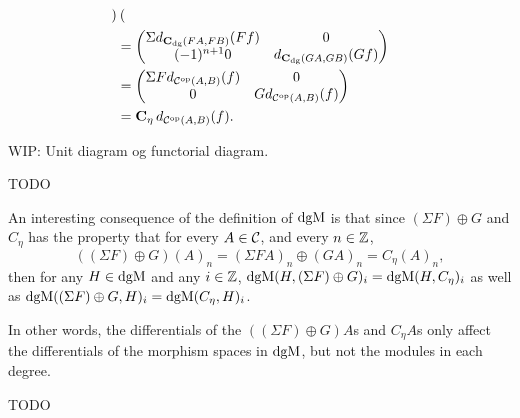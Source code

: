 \begin{remark}
\begin{itemize}
{\begin{align*}
\begin{pmatrix}
                \end{pmatrix} \\
                &=
                \begin{pmatrix}
                    \Sigma d_{\operatorname{\mathbf{C}}_{\operatorname{dg}}(F A, F B)}(F f) & 0 \\
                    (-1)^{n + 1} 0 & d_{\operatorname{\mathbf{C}}_{\operatorname{dg}}(G A, G B)}(G f)
                \end{pmatrix} \\
                &=
                \begin{pmatrix}
                    \Sigma F d_{{\mathcal{C}}^{\operatorname{op}}(A, B)}(f) & 0 \\
                    0 & G d_{{\mathcal{C}}^{\operatorname{op}}(A, B)}(f)
                \end{pmatrix} \\
                &= \operatorname{\mathbf{C}}_{\eta} d_{{\mathcal{C}}^{\operatorname{op}}(A, B)}(f).
            \end{align*}
        }
    \end{itemize}
     
    WIP: Unit diagram og functorial diagram.
\end{remark}

TODO

\begin{remark}
    \label{rem:dgm_different_dg_morphisms_same_space_give_degree-wise_same_morphisms}
    An interesting consequence of the definition of \( \operatorname{dgM} \) is that since \( (\Sigma F) \oplus G \) and \( C_{\eta} \) has the property that for every \( A \in {\mathcal{C}} \), and every \( n \in {\mathbb{Z}} \),
    \[
        ((\Sigma F) \oplus G)(A)_n = (\Sigma F A)_n \oplus (G A)_n = C_{\eta}(A)_n,
    \]
    then for any \( H \in \operatorname{dgM} \) and any \( i \in {\mathbb{Z}} \), \( \operatorname{dgM}(H, (\Sigma F) \oplus G)_i = \operatorname{dgM}(H, C_{\eta})_i \) as well as \( \operatorname{dgM}((\Sigma F) \oplus G, H)_i = \operatorname{dgM}(C_{\eta}, H)_i \).

    In other words, the differentials of the \( ((\Sigma F) \oplus G) A \)s and \( C_{\eta} A \)s only affect the differentials of the morphism spaces in \( \operatorname{dgM} \), but not the modules in each degree.
\end{remark}

TODO

